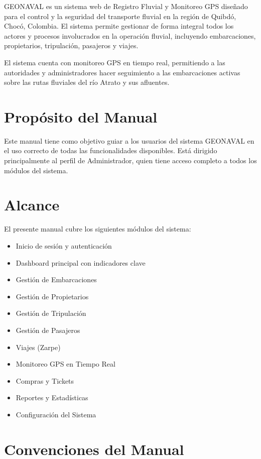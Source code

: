 \documentclass[12pt,a4paper]{report}
\begin{document}
GEONAVAL es un sistema web de Registro Fluvial y Monitoreo GPS diseñado para el control y la seguridad del transporte fluvial en la región de Quibdó, Chocó, Colombia. El sistema permite gestionar de forma integral todos los actores y procesos involucrados en la operación fluvial, incluyendo embarcaciones, propietarios, tripulación, pasajeros y viajes.

El sistema cuenta con monitoreo GPS en tiempo real, permitiendo a las autoridades y administradores hacer seguimiento a las embarcaciones activas sobre las rutas fluviales del río Atrato y sus afluentes.

\section{Propósito del Manual}

Este manual tiene como objetivo guiar a los usuarios del sistema GEONAVAL en el uso correcto de todas las funcionalidades disponibles. Está dirigido principalmente al perfil de Administrador, quien tiene acceso completo a todos los módulos del sistema.

\section{Alcance}

El presente manual cubre los siguientes módulos del sistema:

\begin{itemize}
  \item Inicio de sesión y autenticación
  \item Dashboard principal con indicadores clave
  \item Gestión de Embarcaciones
  \item Gestión de Propietarios
  \item Gestión de Tripulación
  \item Gestión de Pasajeros
  \item Viajes (Zarpe)
  \item Monitoreo GPS en Tiempo Real
  \item Compras y Tickets
  \item Reportes y Estadísticas
  \item Configuración del Sistema
\end{itemize}

\section{Convenciones del Manual}
\end{document}
